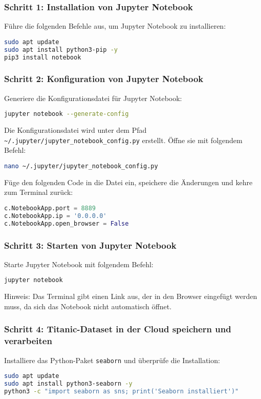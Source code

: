 \documentclass[a4paper,12pt]{article}
\begin{document}
\subsubsection{Schritt 1: Installation von Jupyter Notebook}
Führe die folgenden Befehle aus, um Jupyter Notebook zu installieren:
\begin{lstlisting}[language=bash]
sudo apt update
sudo apt install python3-pip -y
pip3 install notebook
\end{lstlisting}

\subsubsection{Schritt 2: Konfiguration von Jupyter Notebook}
Generiere die Konfigurationsdatei für Jupyter Notebook:
\begin{lstlisting}[language=bash]
jupyter notebook --generate-config
\end{lstlisting}

Die Konfigurationsdatei wird unter dem Pfad \texttt{\textasciitilde/.jupyter/jupyter\_notebook\_config.py} erstellt. Öffne sie mit folgendem Befehl:
\begin{lstlisting}[language=bash]
nano ~/.jupyter/jupyter_notebook_config.py
\end{lstlisting}

Füge den folgenden Code in die Datei ein, speichere die Änderungen und kehre zum Terminal zurück:
\begin{lstlisting}[language=Python]
c.NotebookApp.port = 8889
c.NotebookApp.ip = '0.0.0.0'
c.NotebookApp.open_browser = False
\end{lstlisting}

\subsubsection{Schritt 3: Starten von Jupyter Notebook}
Starte Jupyter Notebook mit folgendem Befehl:
\begin{lstlisting}[language=bash]
jupyter notebook
\end{lstlisting}

Hinweis: Das Terminal gibt einen Link aus, der in den Browser eingefügt werden muss, da sich das Notebook nicht automatisch öffnet.

\subsubsection{Schritt 4: Titanic-Dataset in der Cloud speichern und verarbeiten}
Installiere das Python-Paket \texttt{seaborn} und überprüfe die Installation:
\begin{lstlisting}[language=bash]
sudo apt update
sudo apt install python3-seaborn -y
python3 -c "import seaborn as sns; print('Seaborn installiert')"
\end{lstlisting}
\end{document}
